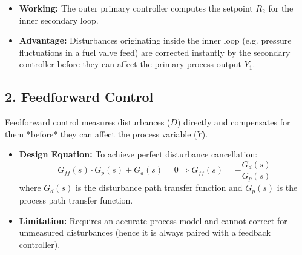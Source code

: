 \documentclass[12pt,a4paper]{article}
\begin{document}
\begin{itemize}[leftmargin=*, itemsep=2.5pt]
  \item \textbf{Working:} The outer primary controller computes the setpoint $R_2$ for the inner secondary loop. 
  \item \textbf{Advantage:} Disturbances originating inside the inner loop (e.g. pressure fluctuations in a fuel valve feed) are corrected instantly by the secondary controller before they can affect the primary process output $Y_1$.
\end{itemize}

\subsection{2. Feedforward Control}
Feedforward control measures disturbances ($D$) directly and compensates for them *before* they can affect the process variable ($Y$).

\begin{tcolorbox}[tikzbox, title={Combined Feedforward-Feedback Control System}]
\centering
{}
\end{tcolorbox}

\begin{itemize}[leftmargin=*, itemsep=2.5pt]
  \item \textbf{Design Equation:} To achieve perfect disturbance cancellation:
    \[
    G_{ff}(s) \cdot G_p(s) + G_d(s) = 0 \Rightarrow G_{ff}(s) = -\frac{G_d(s)}{G_p(s)}
    \]
    where $G_d(s)$ is the disturbance path transfer function and $G_p(s)$ is the process path transfer function.
  \item \textbf{Limitation:} Requires an accurate process model and cannot correct for unmeasured disturbances (hence it is always paired with a feedback controller).
\end{itemize}
\end{document}
